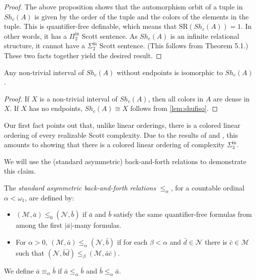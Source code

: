 \documentclass[11pt]{amsart}
\newcommand{\SR}{\text{SR}}
\newcommand{\mc}[1]{\mathcal{#1}}
\newcommand{\Pinf}[1]{\Pi^{\mathrm{in}}_{#1}}
\newcommand{\Sinf}[1]{\Sigma^{\mathrm{in}}_{#1}}
\theoremstyle{remark}
\begin{document}
\begin{proof}
    The above proposition shows that the automorphism orbit of a tuple in $Sh_c(A)$ is given by the order of the tuple and the colors of the elements in the tuple.
    This is quantifier-free definable, which means that $\SR(Sh_c(A))=1$.
    In other words, it has a $\Pinf{2}$ Scott sentence.
    As $Sh_c(A)$ is an infinite relational structure, it cannot have a $\Sinf{2}$ Scott sentence.
    (This follows from \cite{AGNHTT} Theorem 5.1.)
    These two facts together yield the desired result.


\end{proof}

\begin{corollary}\label{cor:self-sim}
    Any non-trivial interval of $Sh_c(A)$ without endpoints is isomorphic to $Sh_c(A)$.
\end{corollary}

\begin{proof}
 If $X$ is a non-trivial interval of $Sh_c(A)$, then all colors in $A$ are dense in $X$.
 If $X$ has no endpoints, $Sh_c(A)\cong X$ follows from \cref{lem:shufiso}.
\end{proof}

Our first fact points out that, unlike linear orderings, there is a colored linear ordering of every realizable Scott complexity.
Due to the results of \cite{GR23} and \cite{GHTH}, this amounts to showing that there is a colored linear ordering of complexity $\Sinf{3}$.

We will use the (standard asymmetric) back-and-forth relations
to demonstrate this claim.
\begin{definition}
The \textit{standard asymmetric back-and-forth relations} $\leq_\alpha$, for a countable ordinal $\alpha < \omega_1$, are defined by:
    \begin{itemize}
        \item $(\mc{M},\bar{a}) \leq_0 (\mc{N},\bar{b})$ if $\bar{a}$ and $\bar{b}$ satisfy the same quantifier-free formulas from among the first $|\bar{a}|$-many formulas.
        \item For $\alpha > 0$, $(\mc{M},\bar{a}) \leq_\alpha (\mc{N},\bar{b})$ if for each $\beta < \alpha$ and $\bar{d} \in \mc{N}$ there is $\bar{c} \in \mc{M}$ such that $(\mc{N},\bar{b} \bar{d}) \leq_\beta (\mc{M},\bar{a} \bar{c})$.
    \end{itemize}
We define $\bar{a} \equiv_\alpha \bar{b}$ if $\bar{a} \leq_\alpha \bar{b}$ and $\bar{b} \leq_\alpha \bar{a}$.
\end{definition}
\end{document}
